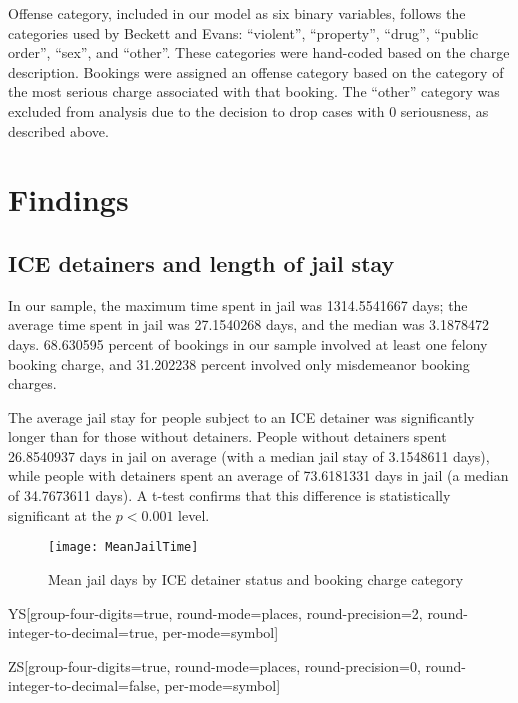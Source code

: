 \documentclass[12pt]{report}\usepackage[]{graphicx}\usepackage[]{color}
\begin{document}
Offense category, included in our model as six binary variables, follows the categories used by Beckett and Evans: ``violent'', ``property'', ``drug'', ``public order'', ``sex'', and ``other''. These categories were hand-coded based on the charge description. Bookings were assigned an offense category based on the category of the most serious charge associated with that booking. The ``other'' category was excluded from analysis due to the decision to drop cases with 0 seriousness, as described above.

\section*{Findings}

\subsection*{ICE detainers and length of jail stay}

In our sample, the maximum time spent in jail was \num{1314.5541667} days; the average time spent in jail was \num{27.1540268} days, and the median was \num{3.1878472} days. \num{68.630595} percent of bookings in our sample involved at least one felony booking charge, and \num{31.202238} percent involved only misdemeanor booking charges.

The average jail stay for people subject to an ICE detainer was significantly longer than for those without detainers. People without detainers spent \num{26.8540937} days in jail on average (with a median jail stay of \num{3.1548611} days), while people with detainers spent an average of \num{73.6181331} days in jail (a median of \num{34.7673611} days). A t-test confirms that this difference is statistically significant at the $p < 0.001$ level.



\begin{figure}[h]
\caption{Mean jail days by ICE detainer status and booking charge category}
\label{fig:DetainerChargeFigure}
\centering
\texttt{[image: MeanJailTime]}
\end{figure}

\newcolumntype Y{S[group-four-digits=true,
				   round-mode=places,
				   round-precision=2,
				   round-integer-to-decimal=true,
				   per-mode=symbol]}

\newcolumntype Z{S[group-four-digits=true,
				   round-mode=places,
				   round-precision=0,
				   round-integer-to-decimal=false,
				   per-mode=symbol]}
\end{document}
